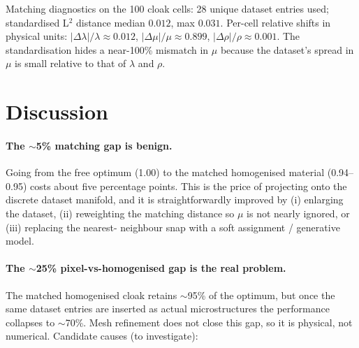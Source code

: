 \documentclass[11pt,a4paper]{article}
\begin{document}
\noindent
Matching diagnostics on the 100 cloak cells: 28 unique dataset entries
used; standardised L$^2$ distance median $0.012$, max $0.031$.
Per-cell relative shifts in physical units:
$|\Delta\lambda|/\lambda \approx 0.012$,
$|\Delta\mu|/\mu \approx 0.899$,
$|\Delta\rho|/\rho \approx 0.001$.
The standardisation hides a near-100\% mismatch in $\mu$ because the
dataset's spread in $\mu$ is small relative to that of $\lambda$ and
$\rho$.

\section{Discussion}

\paragraph{The $\sim$5\% matching gap is benign.}
Going from the free optimum (1.00) to the matched homogenised material
(0.94--0.95) costs about five percentage points. This is the price of
projecting onto the discrete dataset manifold, and it is straightforwardly
improved by (i) enlarging the dataset, (ii) reweighting the matching
distance so $\mu$ is not nearly ignored, or (iii) replacing the nearest-
neighbour snap with a soft assignment / generative model.

\paragraph{The $\sim$25\% pixel-vs-homogenised gap is the real problem.}
The matched homogenised cloak retains $\sim$95\% of the optimum, but
once the same dataset entries are inserted as actual microstructures the
performance collapses to $\sim$70\%. Mesh refinement does not close this
gap, so it is physical, not numerical. Candidate causes (to investigate):
\end{document}
